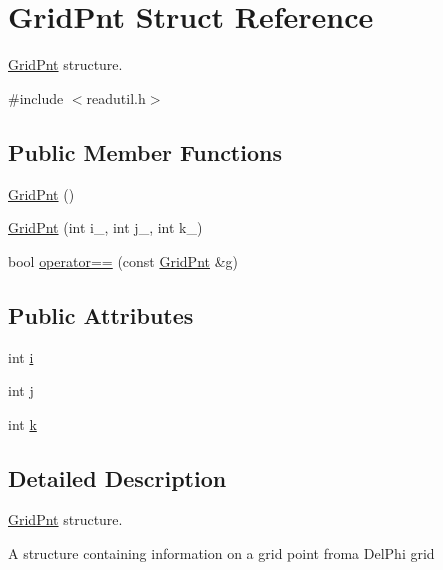 \hypertarget{structGridPnt}{\section{Grid\-Pnt Struct Reference}
\label{structGridPnt}
}


\hyperlink{structGridPnt}{Grid\-Pnt} structure.  




{\ttfamily \#include $<$readutil.\-h$>$}

\subsection*{Public Member Functions}
\begin{DoxyCompactItemize}
\item 
\hyperlink{structGridPnt_a08aa7fab75620b5afd57542f8a9e4a50}{Grid\-Pnt} ()
\item 
\hyperlink{structGridPnt_a08199d724e46964774dc897a23ba58b0}{Grid\-Pnt} (int i\-\_\-, int j\-\_\-, int k\-\_\-)
\item 
bool \hyperlink{structGridPnt_a02d9427b947410745ff3f6ee3ccf411f}{operator==} (const \hyperlink{structGridPnt}{Grid\-Pnt} \&g)
\end{DoxyCompactItemize}
\subsection*{Public Attributes}
\begin{DoxyCompactItemize}
\item 
int \hyperlink{structGridPnt_a681ba43b49366bbae8bf253c7d7b187e}{i}
\item 
int \hyperlink{structGridPnt_a2a2569f44086eafadc03ff01df5e497f}{j}
\item 
int \hyperlink{structGridPnt_a9def14770e53c1f741733b686bd1d61f}{k}
\end{DoxyCompactItemize}


\subsection{Detailed Description}
\hyperlink{structGridPnt}{Grid\-Pnt} structure. 

A structure containing information on a grid point froma Del\-Phi grid 

